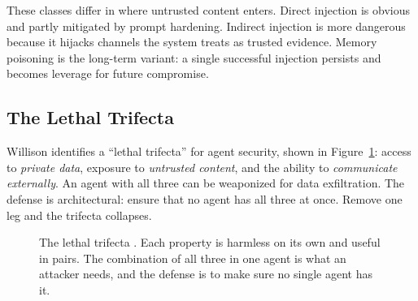 \documentclass[11pt]{book}
\begin{document}
These classes differ in where untrusted content enters. Direct injection is obvious and partly mitigated by prompt hardening. Indirect injection is more dangerous because it hijacks channels the system treats as trusted evidence. Memory poisoning is the long-term variant: a single successful injection persists and becomes leverage for future compromise.

\subsection{The Lethal Trifecta}

Willison \cite{willison2025} identifies a ``lethal trifecta'' for agent security, shown in Figure~\ref{fig:trifecta}: access to \textit{private data}, exposure to \textit{untrusted content}, and the ability to \textit{communicate externally}. An agent with all three can be weaponized for data exfiltration. The defense is architectural: ensure that no agent has all three at once. Remove one leg and the trifecta collapses.

\begin{figure}[htbp]
\centering
{}
\caption{The lethal trifecta \cite{willison2025}. Each property is harmless on its own and useful in pairs. The combination of all three in one agent is what an attacker needs, and the defense is to make sure no single agent has it.}
\label{fig:trifecta}
\end{figure}
\end{document}
